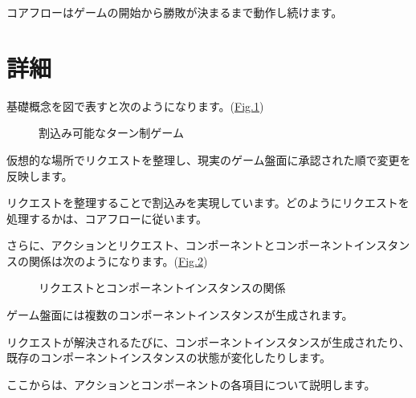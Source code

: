 \documentclass[letterpaper,10pt,dvipdfmx]{sphinxmanual}
\begin{document}
\sphinxAtStartPar
コアフローはゲームの開始から勝敗が決まるまで動作し続けます。


\section{詳細}
\label{\detokenize{core/core:id12}}
\sphinxAtStartPar
基礎概念を図で表すと次のようになります。(\hyperref[\detokenize{core/core:abstract-core-image}]{Fig.\@ \ref{\detokenize{core/core:abstract-core-image}}})

\begin{figure}[htbp]
\centering
\capstart

\noindent{}
\caption{割込み可能なターン制ゲーム}\label{\detokenize{core/core:id35}}\label{\detokenize{core/core:abstract-core-image}}\end{figure}

\sphinxAtStartPar
仮想的な場所でリクエストを整理し、現実のゲーム盤面に承認された順で変更を反映します。

\sphinxAtStartPar
リクエストを整理することで割込みを実現しています。どのようにリクエストを処理するかは、コアフローに従います。

\sphinxAtStartPar
さらに、アクションとリクエスト、コンポーネントとコンポーネントインスタンスの関係は次のようになります。(\hyperref[\detokenize{core/core:action-request-image}]{Fig.\@ \ref{\detokenize{core/core:action-request-image}}})

\begin{figure}[htbp]
\centering
\capstart

\noindent{}
\caption{リクエストとコンポーネントインスタンスの関係}\label{\detokenize{core/core:id36}}\label{\detokenize{core/core:action-request-image}}\end{figure}

\sphinxAtStartPar
ゲーム盤面には複数のコンポーネントインスタンスが生成されます。

\sphinxAtStartPar
リクエストが解決されるたびに、コンポーネントインスタンスが生成されたり、既存のコンポーネントインスタンスの状態が変化したりします。

\sphinxAtStartPar
ここからは、アクションとコンポーネントの各項目について説明します。
\end{document}
